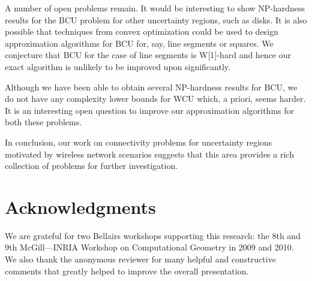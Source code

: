 A number of open problems remain.
 It would be interesting to show NP-hardness results for the BCU problem for other uncertainty regions, such as disks.
It is also possible that techniques from convex optimization could be used to design approximation algorithms for BCU for, say, line segments or squares.
We conjecture that BCU for the case of line segments is W[1]-hard and hence our exact algorithm is unlikely to be improved upon significantly.

Although we have been
able to obtain several NP-hardness results for BCU, we do not have any
complexity lower bounds for WCU which, a priori, seems harder. It is an
interesting open question to improve our approximation algorithms for both
these problems.

In conclusion, our work on connectivity problems for uncertainty regions motivated by wireless network scenarios suggests that this area provides a rich collection of problems for further investigation.





 

\section*{Acknowledgments}
We are grateful for two Bellairs workshops supporting this research: the 8th and 9th McGill---INRIA Workshop on Computational Geometry in 2009 and 2010. 
We also thank the anonymous reviewer for many helpful and constructive comments that greatly helped
to improve the overall presentation.







